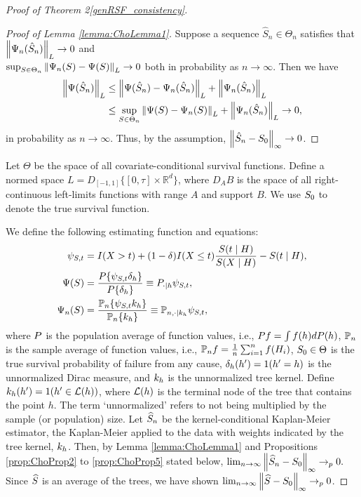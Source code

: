 \begin{proof}[Proof of Theorem \ifnum{} 2\else \ref{genRSF_consistency}\fi]
\begin{proof}[Proof of Lemma \ref{lemma:ChoLemma1}] Suppose a sequence $\hat{S}_n \in \Theta_n$ satisfies that $\left\lVert\Psi_n(\hat{S}_n)\right\rVert_L \rightarrow 0$ and \\ $\sup_{S \in \Theta_n} \left\lVert\Psi_n(S) - \Psi(S)\right\rVert_L \rightarrow 0$ both in probability as $n \rightarrow \infty$. Then we have
\begin{align*}
    \left\lVert\Psi(\hat{S}_n)\right\rVert_L &\leq \left\lVert\Psi(\hat{S}_n) - \Psi_n(\hat{S}_n)\right\rVert_L + \left\lVert\Psi_n(\hat{S}_n)\right\rVert_L \\
    &\leq \sup_{S \in \Theta_n} \left\lVert\Psi(S) - \Psi_n(S)\right\rVert_L + \left\lVert\Psi_n(\hat{S}_n)\right\rVert_L \rightarrow 0,
\end{align*}
in probability as $n \rightarrow \infty$. Thus, by the assumption, $\left\lVert\hat{S}_n - S_0\right\rVert_{\infty} \rightarrow 0$.
\end{proof}

Let $\Theta$ be the space of all covariate-conditional survival functions. Define a normed space $L = D_{[-1,1]}\{[0, \tau]\times \mathbb{R}^d\}$, where $D_{A}B$ is the space of all right-continuous left-limits functions with range $A$ and support $B$. We use $S_0$ to denote the true survival function.

We define the following estimating function and equations:
\begin{align}
\psi_{S,t} &= I(X>t) + (1 - \delta) I(X\leq t) \frac{S(t \mid H)}{S(X \mid H)} - S(t \mid H), \\
\Psi(S) &= \frac{P\{\psi_{S,t} \delta_h \}}{P\{\delta_h\}} \equiv P_{\cdot\mid h}\psi_{S,t}, \\
\Psi_n(S) &= \frac{\mathbb{P}_n\{\psi_{S,t} k_h \}}{\mathbb{P}_n\{k_h\}} \equiv \mathbb{P}_{n,\cdot\mid k_h}\psi_{S,t},
\end{align}
where $P$ is the population average of function values, i.e., $P f = \int f(h) dP(h)$, $\mathbb{P}_n$ is the sample average of function values, i.e., $\mathbb{P}_n f = \frac{1}{n} \sum_{i=1}^{n} f(H_i)$, $S_0 \in \Theta$ is the true survival probability of failure from any cause, $\delta_h(h') = 1(h' = h)$ is the unnormalized Dirac measure, and $k_h$ is the unnormalized tree kernel. Define $k_h(h') = 1(h' \in \mathcal{L}(h))$, where $\mathcal{L}(h)$ is the terminal node of the tree that contains the point $h$. The term `unnormalized' refers to not being multiplied by the sample (or population) size. Let $\widehat{S}_n$ be the kernel-conditional Kaplan-Meier estimator, the Kaplan-Meier applied to the data with weights indicated by the tree kernel, $k_h$. %
Then, by Lemma \ref{lemma:ChoLemma1} and Propositions \ref{prop:ChoProp2} to \ref{prop:ChoProp5} stated below,
$\lim_{n \to \infty} \left\lVert\widehat{S}_n - S_0\right\rVert_\infty \to_p 0.$ Since $\widehat{S}$ is an average of the trees, we have shown $\lim_{n \to \infty} \left\lVert\widehat{S} - S_0\right\rVert_\infty \to_p 0$.


\end{proof}
